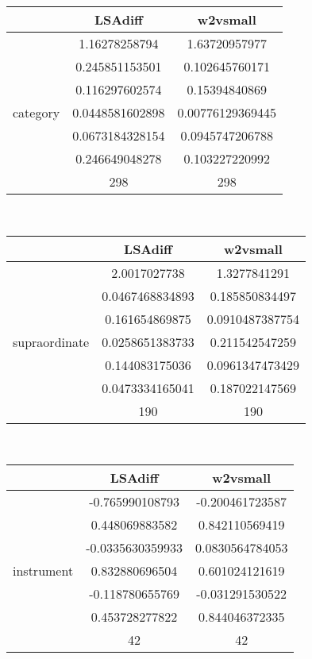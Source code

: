 \documentclass{article}
\begin{document}
\begin{tabular}{ccc|}\cline{2-3}
&\multicolumn{1}{|c}{LSAdiff} & w2vsmall \\\hline
\multicolumn{1}{|c|}{\multirow{7}{*}{category}} & 1.16278258794 & 1.63720957977 \\
\multicolumn{1}{|c|}{} & 0.245851153501 & 0.102645760171 \\
\multicolumn{1}{|c|}{} & 0.116297602574 & 0.15394840869 \\
\multicolumn{1}{|c|}{} & 0.0448581602898 & 0.00776129369445 \\
\multicolumn{1}{|c|}{} & 0.0673184328154 & 0.0945747206788 \\
\multicolumn{1}{|c|}{} & 0.246649048278 & 0.103227220992 \\
\multicolumn{1}{|c|}{} & 298 & 298 \\
\hline
\end{tabular}\\
\begin{tabular}{ccc|}\cline{2-3}
&\multicolumn{1}{|c}{LSAdiff} & w2vsmall \\\hline
\multicolumn{1}{|c|}{\multirow{7}{*}{supraordinate}} & 2.0017027738 & 1.3277841291 \\
\multicolumn{1}{|c|}{} & 0.0467468834893 & 0.185850834497 \\
\multicolumn{1}{|c|}{} & 0.161654869875 & 0.0910487387754 \\
\multicolumn{1}{|c|}{} & 0.0258651383733 & 0.211542547259 \\
\multicolumn{1}{|c|}{} & 0.144083175036 & 0.0961347473429 \\
\multicolumn{1}{|c|}{} & 0.0473334165041 & 0.187022147569 \\
\multicolumn{1}{|c|}{} & 190 & 190 \\
\hline
\end{tabular}\\
\begin{tabular}{ccc|}\cline{2-3}
&\multicolumn{1}{|c}{LSAdiff} & w2vsmall \\\hline
\multicolumn{1}{|c|}{\multirow{7}{*}{instrument}} & -0.765990108793 & -0.200461723587 \\
\multicolumn{1}{|c|}{} & 0.448069883582 & 0.842110569419 \\
\multicolumn{1}{|c|}{} & -0.0335630359933 & 0.0830564784053 \\
\multicolumn{1}{|c|}{} & 0.832880696504 & 0.601024121619 \\
\multicolumn{1}{|c|}{} & -0.118780655769 & -0.031291530522 \\
\multicolumn{1}{|c|}{} & 0.453728277822 & 0.844046372335 \\
\multicolumn{1}{|c|}{} & 42 & 42 \\
\hline
\end{tabular}\\
\end{document}
